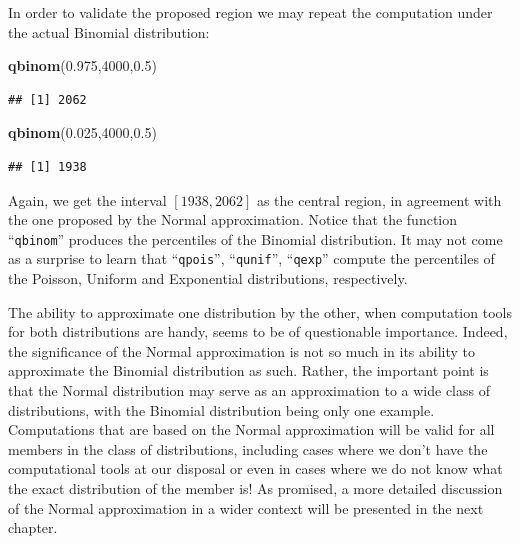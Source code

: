 \documentclass[]{krantz}
\makeatletter
\newenvironment{Shaded}{\begin{snugshade}}{\end{snugshade}}
\newcommand{\DecValTok}[1]{\textcolor[rgb]{0.00,0.00,0.81}{#1}}
\newcommand{\FloatTok}[1]{\textcolor[rgb]{0.00,0.00,0.81}{#1}}
\newcommand{\KeywordTok}[1]{\textcolor[rgb]{0.13,0.29,0.53}{\textbf{#1}}}
\newcommand{\NormalTok}[1]{#1}
\newenvironment{kframe}{%
\medskip{}
\setlength{\fboxsep}{.8em}
 \def\at@end@of@kframe{}%
 \ifinner\ifhmode%
  \def\at@end@of@kframe{\end{minipage}}%
  \begin{minipage}{\columnwidth}%
 \fi\fi%
 \def\FrameCommand##1{\hskip\@totalleftmargin \hskip-\fboxsep
 \colorbox{shadecolor}{##1}\hskip-\fboxsep
     \hskip-\linewidth \hskip-\@totalleftmargin \hskip\columnwidth}%
 \MakeFramed {\advance\hsize-\width
   \@totalleftmargin\z@ \linewidth\hsize
   \@setminipage}}%
 {\par\unskip\endMakeFramed%
 \at@end@of@kframe}
\renewenvironment{Shaded}{\begin{kframe}}{\end{kframe}}
\theoremstyle{definition}
\theoremstyle{definition}
\theoremstyle{definition}
\theoremstyle{remark}
\makeatother
\begin{document}
In order to validate the proposed region we may repeat the computation
under the actual Binomial distribution:

\begin{Shaded}
\begin{Highlighting}[]
\KeywordTok{qbinom}\NormalTok{(}\FloatTok{0.975}\NormalTok{,}\DecValTok{4000}\NormalTok{,}\FloatTok{0.5}\NormalTok{)}
\end{Highlighting}
\end{Shaded}

\begin{verbatim}
## [1] 2062
\end{verbatim}

\begin{Shaded}
\begin{Highlighting}[]
\KeywordTok{qbinom}\NormalTok{(}\FloatTok{0.025}\NormalTok{,}\DecValTok{4000}\NormalTok{,}\FloatTok{0.5}\NormalTok{)}
\end{Highlighting}
\end{Shaded}

\begin{verbatim}
## [1] 1938
\end{verbatim}

Again, we get the interval \([1938,2062]\) as the central region, in
agreement with the one proposed by the Normal approximation. Notice that
the function ``\texttt{qbinom}'' produces the percentiles of the Binomial
distribution. It may not come as a surprise to learn that ``\texttt{qpois}'',
``\texttt{qunif}'', ``\texttt{qexp}'' compute the percentiles of the Poisson, Uniform and
Exponential distributions, respectively.

The ability to approximate one distribution by the other, when
computation tools for both distributions are handy, seems to be of
questionable importance. Indeed, the significance of the Normal
approximation is not so much in its ability to approximate the Binomial
distribution as such. Rather, the important point is that the Normal
distribution may serve as an approximation to a wide class of
distributions, with the Binomial distribution being only one example.
Computations that are based on the Normal approximation will be valid
for all members in the class of distributions, including cases where we
don't have the computational tools at our disposal or even in cases
where we do not know what the exact distribution of the member is! As
promised, a more detailed discussion of the Normal approximation in a
wider context will be presented in the next chapter.
\end{document}
